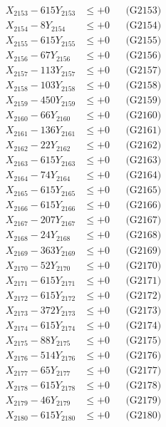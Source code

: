 \documentclass[a4paper,10pt]{article}
\begin{document}
{\begin{align}
X_{2153} - 615Y_{2153} &\leq +0 && \text{(G2153)} \\
X_{2154} - 8Y_{2154} &\leq +0 && \text{(G2154)} \\
X_{2155} - 615Y_{2155} &\leq +0 && \text{(G2155)} \\
X_{2156} - 67Y_{2156} &\leq +0 && \text{(G2156)} \\
X_{2157} - 113Y_{2157} &\leq +0 && \text{(G2157)} \\
X_{2158} - 103Y_{2158} &\leq +0 && \text{(G2158)} \\
X_{2159} - 450Y_{2159} &\leq +0 && \text{(G2159)} \\
X_{2160} - 66Y_{2160} &\leq +0 && \text{(G2160)} \\
\allowbreak
X_{2161} - 136Y_{2161} &\leq +0 && \text{(G2161)} \\
X_{2162} - 22Y_{2162} &\leq +0 && \text{(G2162)} \\
X_{2163} - 615Y_{2163} &\leq +0 && \text{(G2163)} \\
X_{2164} - 74Y_{2164} &\leq +0 && \text{(G2164)} \\
X_{2165} - 615Y_{2165} &\leq +0 && \text{(G2165)} \\
X_{2166} - 615Y_{2166} &\leq +0 && \text{(G2166)} \\
X_{2167} - 207Y_{2167} &\leq +0 && \text{(G2167)} \\
X_{2168} - 24Y_{2168} &\leq +0 && \text{(G2168)} \\
X_{2169} - 363Y_{2169} &\leq +0 && \text{(G2169)} \\
X_{2170} - 52Y_{2170} &\leq +0 && \text{(G2170)} \\
\allowbreak
X_{2171} - 615Y_{2171} &\leq +0 && \text{(G2171)} \\
X_{2172} - 615Y_{2172} &\leq +0 && \text{(G2172)} \\
X_{2173} - 372Y_{2173} &\leq +0 && \text{(G2173)} \\
X_{2174} - 615Y_{2174} &\leq +0 && \text{(G2174)} \\
X_{2175} - 88Y_{2175} &\leq +0 && \text{(G2175)} \\
X_{2176} - 514Y_{2176} &\leq +0 && \text{(G2176)} \\
X_{2177} - 65Y_{2177} &\leq +0 && \text{(G2177)} \\
X_{2178} - 615Y_{2178} &\leq +0 && \text{(G2178)} \\
X_{2179} - 46Y_{2179} &\leq +0 && \text{(G2179)} \\
X_{2180} - 615Y_{2180} &\leq +0 && \text{(G2180)} \\

\end{align}}
\end{document}
